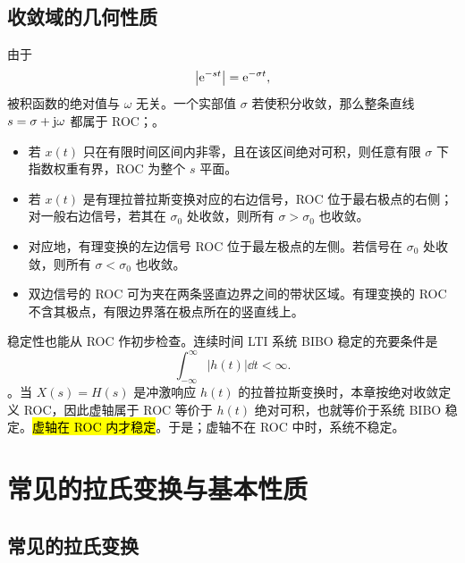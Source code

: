 \subsection{收敛域的几何性质}
\label{subsec:laplace-roc-properties}

由于
\[
  \left|\mathrm{e}^{-st}\right|=\mathrm{e}^{-\sigma t},
\]
被积函数的绝对值与 $\omega$ 无关。一个实部值 $\sigma$ 若使积分收敛，那么整条直线 $s=\sigma+\mathrm{j}\omega$ 都属于 ROC；。

\begin{itemize}
  \item 若 $x(t)$ 只在有限时间区间内非零，且在该区间绝对可积，则任意有限 $\sigma$ 下指数权重有界，ROC 为整个 $s$ 平面。
  \item 若 $x(t)$ 是有理拉普拉斯变换对应的右边信号，ROC 位于最右极点的右侧；对一般右边信号，若其在 $\sigma_0$ 处收敛，则所有 $\sigma>\sigma_0$ 也收敛。
  \item 对应地，有理变换的左边信号 ROC 位于最左极点的左侧。若信号在 $\sigma_0$ 处收敛，则所有 $\sigma<\sigma_0$ 也收敛。
  \item 双边信号的 ROC 可为夹在两条竖直边界之间的带状区域。有理变换的 ROC 不含其极点，有限边界落在极点所在的竖直线上。
\end{itemize}

稳定性也能从 ROC 作初步检查。连续时间 LTI 系统 BIBO 稳定的充要条件是
\[
  \int_{-\infty}^{\infty}|h(t)|\dd t<\infty.
\]
。当 $X(s)=H(s)$ 是冲激响应 $h(t)$ 的拉普拉斯变换时，本章按绝对收敛定义 ROC，因此虚轴属于 ROC 等价于 $h(t)$ 绝对可积，也就等价于系统 BIBO 稳定。\hl{虚轴在 ROC 内才稳定}。于是；虚轴不在 ROC 中时，系统不稳定。

\section{常见的拉氏变换与基本性质}
\label{sec:laplace-common-pairs-properties}

\subsection{常见的拉氏变换}
\label{subsec:laplace-common-pairs}

